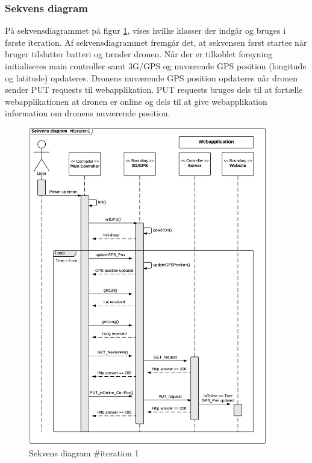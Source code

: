 \newpage
\subsubsection*{Sekvens diagram}
På sekvensdiagrammet på figur \ref{fig:Sekvens_diagram_iteration1}, vises hvilke klasser der indgår og bruges i første iteration. Af sekvensdiagrammet fremgår det, at sekvensen først startes når bruger tilslutter batteri og tænder dronen. Når der er tilkoblet forsyning initialiseres main controller samt 3G/GPS og nuværende GPS position  (longitude og latitude) opdateres. Dronens nuværende GPS position opdateres når dronen sender PUT requests til webapplikation. PUT requests bruges dels til at fortælle webapplikationen at dronen er online og dels til at give webapplikation information om dronens nuværende position. 


\begin{figure}[H]
	\centering
	\includegraphics[width=0.93\textwidth]{Billeder/sekvens/sekvens_iteration1}
	\caption{Sekvens diagram \#iteration 1}
	\label{fig:Sekvens_diagram_iteration1}
\end{figure}


